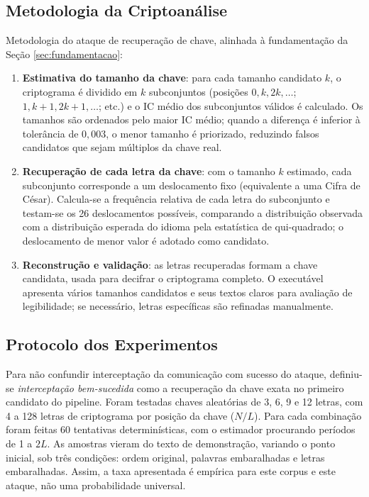 \documentclass[conference]{IEEEtran}
\begin{document}
\subsection{Metodologia da Criptoanálise}

Metodologia do ataque de recuperação de chave, alinhada à
fundamentação da Seção \ref{sec:fundamentacao}:

\begin{enumerate}
\item \textbf{Estimativa do tamanho da chave}: para cada tamanho
  candidato $k$, o criptograma é dividido em $k$ subconjuntos
  (posições $0, k, 2k, \dots$; $1, k{+}1, 2k{+}1, \dots$; etc.) e o
  IC médio dos subconjuntos válidos é calculado. Os tamanhos são
  ordenados pelo maior IC médio; quando a diferença é inferior à
  tolerância de $0{,}003$, o menor tamanho é priorizado, reduzindo
  falsos candidatos que sejam múltiplos da chave real.
\item \textbf{Recuperação de cada letra da chave}: com o tamanho $k$
  estimado, cada subconjunto corresponde a um deslocamento fixo
  (equivalente a uma Cifra de César). Calcula-se a frequência
  relativa de cada letra do subconjunto e testam-se os 26
  deslocamentos possíveis, comparando a distribuição observada com a
  distribuição esperada do idioma \cite{frequencias} pela estatística de
  qui-quadrado; o deslocamento de menor valor é adotado como candidato.
\item \textbf{Reconstrução e validação}: as letras recuperadas
  formam a chave candidata, usada para decifrar o criptograma
  completo. O executável apresenta vários tamanhos candidatos e seus
  textos claros para avaliação de legibilidade; se
  necessário, letras específicas são refinadas manualmente.
\end{enumerate}

\subsection{Protocolo dos Experimentos}

Para não confundir interceptação da comunicação com sucesso do ataque,
definiu-se \emph{interceptação bem-sucedida} como a recuperação da chave
exata no primeiro candidato do pipeline. Foram testadas chaves aleatórias de
3, 6, 9 e 12 letras, com 4 a 128 letras de criptograma por posição da chave
($N/L$). Para cada combinação foram feitas 60 tentativas determinísticas, com
o estimador procurando períodos de 1 a $2L$. As amostras vieram do texto de
demonstração, variando o ponto inicial, sob três condições: ordem original,
palavras embaralhadas e letras embaralhadas. Assim, a taxa apresentada é
empírica para este corpus e este ataque, não uma probabilidade universal.
\end{document}
